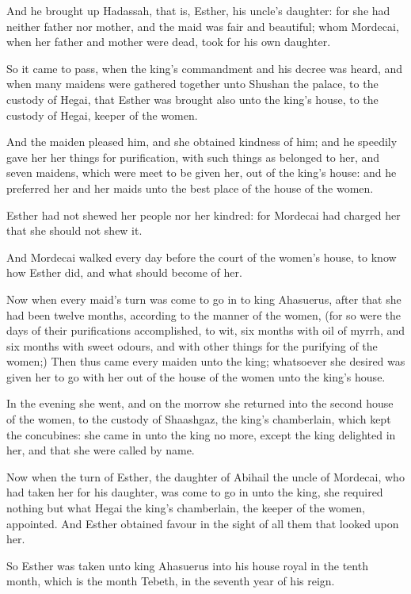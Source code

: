 \Verse And he brought up Hadassah, that is, Esther, his uncle's daughter: for she had neither father nor mother, and the maid was fair and beautiful; whom Mordecai, when her father and mother were dead, took for his own daughter.

\Verse So it came to pass, when the king's commandment and his decree was heard, and when many maidens were gathered together unto Shushan the palace, to the custody of Hegai, that Esther was brought also unto the king's house, to the custody of Hegai, keeper of the women.

\Verse And the maiden pleased him, and she obtained kindness of him; and he speedily gave her her things for purification, with such things as belonged to her, and seven maidens, which were meet to be given her, out of the king's house: and he preferred her and her maids unto the best place of the house of the women.

\Verse Esther had not shewed her people nor her kindred: for Mordecai had charged her that she should not shew it.

\Verse And Mordecai walked every day before the court of the women's house, to know how Esther did, and what should become of her.

\Verse Now when every maid's turn was come to go in to king Ahasuerus, after that she had been twelve months, according to the manner of the women, (for so were the days of their purifications accomplished, to wit, six months with oil of myrrh, and six months with sweet odours, and with other things for the purifying of the women;) \Verse Then thus came every maiden unto the king; whatsoever she desired was given her to go with her out of the house of the women unto the king's house.

\Verse In the evening she went, and on the morrow she returned into the second house of the women, to the custody of Shaashgaz, the king's chamberlain, which kept the concubines: she came in unto the king no more, except the king delighted in her, and that she were called by name.

\Verse Now when the turn of Esther, the daughter of Abihail the uncle of Mordecai, who had taken her for his daughter, was come to go in unto the king, she required nothing but what Hegai the king's chamberlain, the keeper of the women, appointed. And Esther obtained favour in the sight of all them that looked upon her.

\Verse So Esther was taken unto king Ahasuerus into his house royal in the tenth month, which is the month Tebeth, in the seventh year of his reign.

